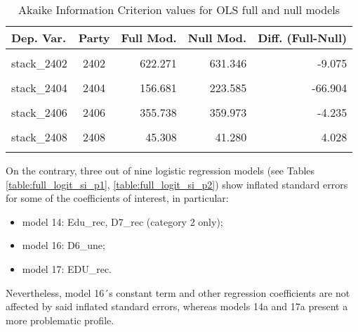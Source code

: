 \documentclass[
]{article}
\providecommand{\tightlist}{%
  \setlength{\itemsep}{0pt}\setlength{\parskip}{0pt}}
\begin{document}
\begin{table}[!h]

\caption{\label{tab:unnamed-chunk-163}Akaike Information Criterion values for OLS full and null models 
        \label{table:ols_aic_si}}
\centering
\begin{tabular}[t]{lcrrr}
\toprule
Dep. Var. & Party & Full Mod. & Null Mod. & Diff. (Full-Null)\\
\midrule
\cellcolor{gray!6}{stack\_2401} & \cellcolor{gray!6}{2401} & \cellcolor{gray!6}{492.524} & \cellcolor{gray!6}{564.516} & \cellcolor{gray!6}{-71.993}\\
stack\_2402 & 2402 & 622.271 & 631.346 & -9.075\\
\cellcolor{gray!6}{stack\_2403} & \cellcolor{gray!6}{2403} & \cellcolor{gray!6}{454.770} & \cellcolor{gray!6}{463.393} & \cellcolor{gray!6}{-8.624}\\
stack\_2404 & 2404 & 156.681 & 223.585 & -66.904\\
\cellcolor{gray!6}{stack\_2405} & \cellcolor{gray!6}{2405} & \cellcolor{gray!6}{424.234} & \cellcolor{gray!6}{442.635} & \cellcolor{gray!6}{-18.402}\\
\addlinespace
stack\_2406 & 2406 & 355.738 & 359.973 & -4.235\\
\cellcolor{gray!6}{stack\_2407} & \cellcolor{gray!6}{2407} & \cellcolor{gray!6}{-6.900} & \cellcolor{gray!6}{0.717} & \cellcolor{gray!6}{-7.616}\\
stack\_2408 & 2408 & 45.308 & 41.280 & 4.028\\
\cellcolor{gray!6}{stack\_2409} & \cellcolor{gray!6}{2409} & \cellcolor{gray!6}{-84.887} & \cellcolor{gray!6}{-82.166} & \cellcolor{gray!6}{-2.721}\\
\bottomrule
\end{tabular}
\end{table}

On the contrary, three out of nine logistic regression models (see Tables \ref{table:full_logit_si_p1},
\ref{table:full_logit_si_p2}) show inflated standard errors for some of the coefficients of interest,
in particular:

\begin{itemize}
\tightlist
\item
  model 14: Edu\_rec, D7\_rec (category 2 only);
\item
  model 16: D6\_une;
\item
  model 17: EDU\_rec.
\end{itemize}

Nevertheless, model 16´s constant term and other regression coefficients are not affected by said inflated standard errors, whereas models 14a and 17a present a more problematic profile.
\end{document}
